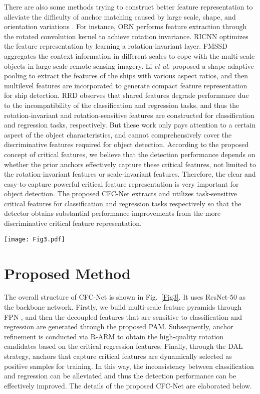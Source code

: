 \documentclass[journal]{IEEEtran}
\begin{document}
There are also some methods trying to construct better feature representation to alleviate the difficulty of anchor matching caused by large scale, shape, and orientation variations \cite{zhou2017oriented, cheng2016learning, wang2019fmssd, li2020novel, zhang2019cad, fu2020rotation}. For instance,  ORN \cite{zhou2017oriented} performs feature extraction through the rotated convolution kernel to achieve rotation invariance. RICNN \cite{cheng2016learning} optimizes the feature representation by learning a  rotation-invariant layer. FMSSD \cite{wang2019fmssd} aggregates the context information in different scales to cope with the multi-scale objects in large-scale remote sensing imagery. Li \textit{et al.}  \cite{li2020novel}  proposed a shape-adaptive pooling to  extract the features of the ships with various aspect ratios, and then multilevel features are incorporated to generate compact feature representation for ship detection. RRD \cite{liao2018rotation} observes that shared features degrade performance due to the incompatibility of the classification and regression tasks, and thus the rotation-invariant and rotation-sensitive features are constructed for classification and regression tasks, respectively. But these work only pays attention to a certain aspect of the object characteristics, and cannot comprehensively cover the discriminative features required for object detection. According to the proposed concept of critical features, we believe that the detection performance depends on whether the prior anchors effectively capture these critical features, not limited to the rotation-invariant features or scale-invariant features. Therefore, the clear and easy-to-capture powerful critical feature representation is very important for object detection. The proposed CFC-Net extracts and utilizes task-sensitive critical features for classification and regression tasks respectively so that the detector obtains substantial performance improvements from the more discriminative critical feature representation.

\begin{figure*}[t]
	\centering
	\texttt{[image: Fig3.pdf]} 
	\caption{Framework of the proposed CFC-Net.}
	\label{Fig3}
\end{figure*}


\section{Proposed Method}
The overall structure of CFC-Net is shown in Fig.~\ref{Fig3}. It uses ResNet-50 as the backbone network. Firstly, we build multi-scale feature pyramids through FPN \cite{lin2017feature}, and then the decoupled features that are sensitive to classification and regression are generated through the proposed PAM. Subsequently, anchor refinement is conducted via R-ARM to obtain the high-quality rotation candidates based on the critical regression features. Finally, through the DAL strategy, anchors that capture critical features are dynamically selected as positive samples for training. In this way, the inconsistency between classification and regression can be alleviated and thus the detection performance can be effectively improved. The details of the proposed CFC-Net are elaborated below.
\end{document}
